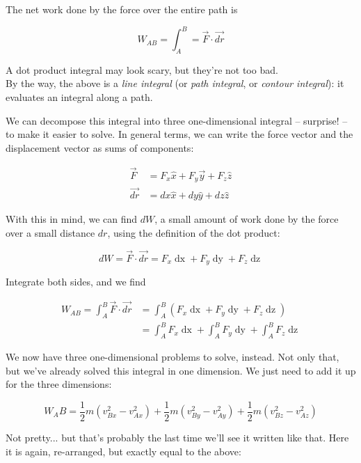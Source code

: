 The net work done by the force over the entire path is

\begin{equation}
W_{AB} = \int_A^B = \vec{F} \cdot \vec{dr}
\end{equation}

A dot product integral may look scary, but they're not too bad.\\
By the way, the above is a \emph{line integral} (or \emph{path integral}, or \emph{contour integral}): it evaluates an integral along a path.

We can decompose this integral into three one-dimensional integral -- surprise! -- to make it easier to solve. In general terms, we can write the force vector and the displacement vector as sums of components:

\begin{align}
\vec{F}  &= F_x \hat{x} + F_y \vec{y} + F_z \hat{z}\\
\vec{dr} &= dx \hat{x} + dy \hat{y} + dz \hat{z}
\end{align}

With this in mind, we can find $dW$, a small amount of work done by the force over a small distance $dr$, using the definition of the dot product:

\begin{equation}
dW = \vec{F} \cdot \vec{dr} = F_x \mathop{dx} + F_y \mathop{dy} + F_z \mathop{dz}
\end{equation}

Integrate both sides, and we find

\begin{align}
W_{AB} = \int_A^B \vec{F} \cdot \vec{dr} &= \int_A^B \left(F_x \mathop{dx} + F_y \mathop{dy} + F_z \mathop{dz}\right)\\
                                    &= \int_A^B F_x \mathop{dx} + \int_A^B F_y \mathop{dy} + \int_A^B F_z \mathop{dz}
\end{align}

We now have three one-dimensional problems to solve, instead. Not only that, but we've already solved this integral in one dimension. We just need to add it up for the three dimensions:

\begin{equation}
W_AB = \frac{1}{2} m \left( v_{Bx}^2 - v_{Ax}^2 \right) + \frac{1}{2} m \left( v_{By}^2 - v_{Ay}^2 \right) + \frac{1}{2} m \left( v_{Bz}^2 - v_{Az}^2 \right)
\end{equation}

Not pretty... but that's probably the last time we'll see it written like that. Here it is again, re-arranged, but exactly equal to the above:

